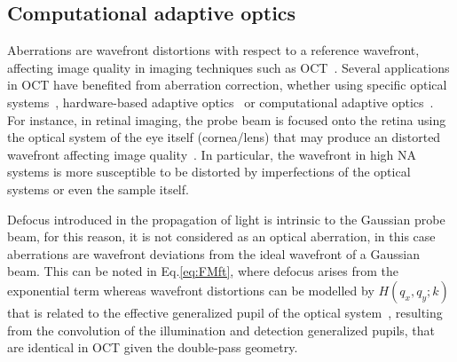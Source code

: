 \subsection{Computational adaptive optics}

Aberrations are wavefront distortions with respect to a reference wavefront, affecting image quality in imaging techniques such as OCT~\cite{Pircher2017_Review}. Several applications in OCT have benefited from aberration correction, whether using specific optical systems~\cite{Meemon2008_Optical, Xi2009_Highresolution,Mo2013_FocusExtension, Bo2017_Depthoffocus}, hardware-based adaptive optics~\cite{Zawadzki2005_Adaptiveoptics, Zhang2006_Highspeed} or computational adaptive optics~\cite{Kumar2017_Invivo, Hillmann2016_Aberrationfree, Fechtig2014_Line, Wu2019_Computed}. For instance, in retinal imaging, the probe beam is focused onto the retina using the optical system of the eye itself (cornea/lens) that may produce an distorted wavefront affecting image quality~\cite{Liang1997_Aberrations}. In particular, the wavefront in high NA systems is more susceptible to be distorted by imperfections of the optical systems or even the sample itself.

Defocus introduced in the propagation of light is intrinsic to the Gaussian probe beam, for this reason, it is not considered as an optical aberration, in this case aberrations are wavefront deviations from the ideal wavefront of a Gaussian beam. This can be noted in Eq.\eqref{eq:FMft}, where defocus arises from the exponential term whereas wavefront distortions can be modelled by $H(q_x, q_y; k)$ that is related to the effective generalized pupil of the optical system~\cite{Liu2017_Computational}, resulting from the convolution of the illumination and detection generalized pupils, that are identical in OCT given the double-pass geometry.

